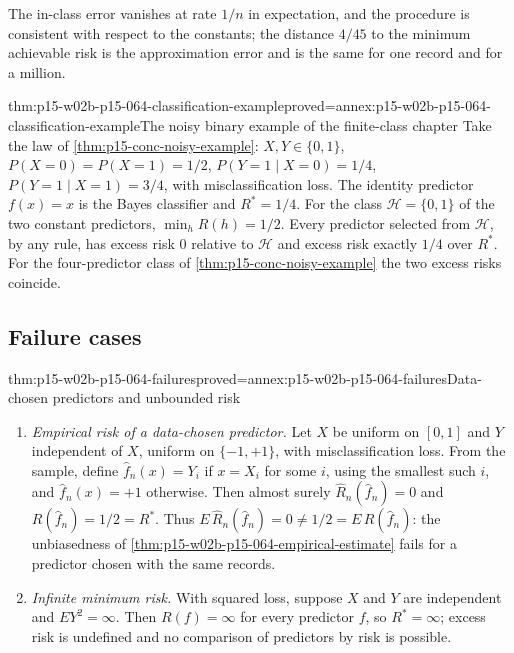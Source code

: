The in-class error vanishes at rate \(1/n\) in expectation, and the procedure
is consistent with respect to the constants; the distance \(4/45\) to the
minimum achievable risk is the approximation error and is the same for one
record and for a million.

\begin{hbtheorem}{thm:p15-w02b-p15-064-classification-example}{proved=annex:p15-w02b-p15-064-classification-example}{The noisy binary example of the finite-class chapter}
Take the law of \cref{thm:p15-conc-noisy-example}: \(X,Y\in\{0,1\}\),
\(P(X=0)=P(X=1)=1/2\), \(P(Y=1\mid X=0)=1/4\), \(P(Y=1\mid X=1)=3/4\), with
misclassification loss. The identity predictor \(f(x)=x\) is the Bayes
classifier and \(R^{*}=1/4\). For the class \(\mathcal H=\{0,1\}\) of the two
constant predictors, \(\min_hR(h)=1/2\). Every predictor selected from
\(\mathcal H\), by any rule, has excess risk \(0\) relative to \(\mathcal H\)
and excess risk exactly \(1/4\) over \(R^{*}\). For the four-predictor class
of \cref{thm:p15-conc-noisy-example} the two excess risks coincide.
\end{hbtheorem}

\subsection{Failure cases}

\begin{hbtheorem}{thm:p15-w02b-p15-064-failures}{proved=annex:p15-w02b-p15-064-failures}{Data-chosen predictors and unbounded risk}
\begin{enumerate}
\item \emph{Empirical risk of a data-chosen predictor.} Let \(X\) be uniform
      on \([0,1]\) and \(Y\) independent of \(X\), uniform on \(\{-1,+1\}\),
      with misclassification loss. From the sample, define
      \(\widehat f_n(x)=Y_i\) if \(x=X_i\) for some \(i\), using the smallest
      such \(i\), and \(\widehat f_n(x)=+1\) otherwise. Then almost surely
      \(\widehat R_n(\widehat f_n)=0\) and \(R(\widehat f_n)=1/2=R^{*}\).
      Thus \(E\,\widehat R_n(\widehat f_n)=0\neq1/2=E\,R(\widehat f_n)\):
      the unbiasedness of \cref{thm:p15-w02b-p15-064-empirical-estimate}
      fails for a predictor chosen with the same records.
\item \emph{Infinite minimum risk.} With squared loss, suppose \(X\) and
      \(Y\) are independent and \(EY^2=\infty\). Then \(R(f)=\infty\) for
      every predictor \(f\), so \(R^{*}=\infty\); excess risk is undefined
      and no comparison of predictors by risk is possible.
\end{enumerate}
\end{hbtheorem}


